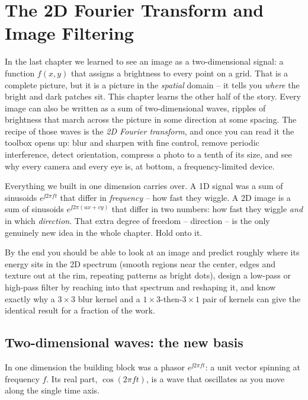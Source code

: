 \chapter{The 2D Fourier Transform and Image Filtering}

In the last chapter we learned to see an image as a two-dimensional signal: a
function $f(x,y)$ that assigns a brightness to every point on a grid. That is a
complete picture, but it is a picture in the \emph{spatial} domain -- it tells you
\emph{where} the bright and dark patches sit. This chapter learns the other half
of the story. Every image can also be written as a sum of two-dimensional waves,
ripples of brightness that march across the picture in some direction at some
spacing. The recipe of those waves is the \emph{2D Fourier transform}, and once
you can read it the toolbox opens up: blur and sharpen with fine
control, remove periodic interference, detect orientation, compress a photo to a
tenth of its size, and see why every camera and every eye is, at bottom, a
frequency-limited device.

Everything we built in one dimension carries over. A 1D signal was a sum of
sinusoids $e^{\jj 2\pi f t}$ that differ in \emph{frequency} -- how fast they
wiggle. A 2D image is a sum of sinusoids $e^{\jj 2\pi (ux + vy)}$ that differ in
two numbers: how fast they wiggle \emph{and} in which \emph{direction}. That extra
degree of freedom -- direction -- is the only genuinely new idea in the whole
chapter. Hold onto it.

\begin{focusbox}
By the end you should be able to look at an image and predict roughly where its
energy sits in the 2D spectrum (smooth regions near the center, edges and texture
out at the rim, repeating patterns as bright dots), design a low-pass or high-pass
filter by reaching into that spectrum and reshaping it, and know exactly why a
$3\times3$ blur kernel and a $1\times3$-then-$3\times1$ pair of kernels can give
the identical result for a fraction of the work.
\end{focusbox}

\section{Two-dimensional waves: the new basis}
\label{ch31:2d-waves}

In one dimension the building block was a phasor $e^{\jj 2\pi f t}$: a unit vector
spinning at frequency $f$. Its real part, $\cos(2\pi f t)$, is a wave that
oscillates as you move along the single time axis.

